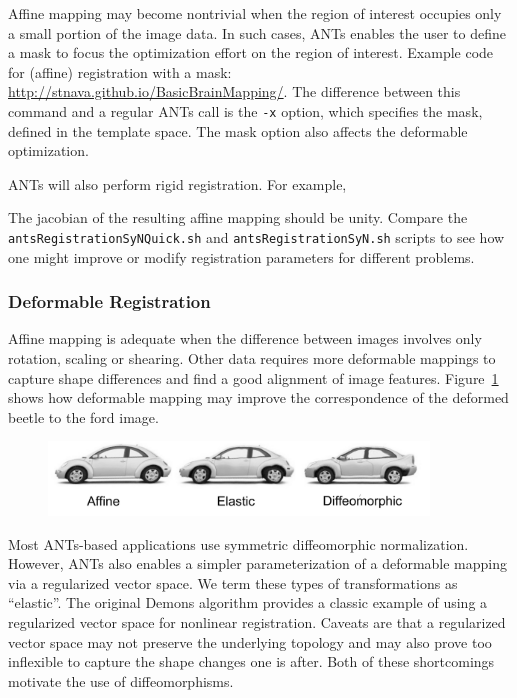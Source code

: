 \documentclass{InsightArticle}
\begin{document}
Affine mapping may become nontrivial when the region of interest 
occupies only a small portion of the image data.  In such cases, 
ANTs enables the user to define a mask to focus the optimization 
effort on the region of interest.  
Example code for (affine) registration with a mask: 
\href{http://stnava.github.io/BasicBrainMapping/}{http://stnava.github.io/BasicBrainMapping/}.
The difference between this command 
and a regular ANTs call is the \verb"-x" option, which specifies the mask, defined in the 
template space.   The mask option also affects the deformable
optimization. 



  ANTs will also perform rigid registration.  For example,  

The jacobian of the resulting affine mapping should be unity.  Compare
the \texttt{antsRegistrationSyNQuick.sh} and
\texttt{antsRegistrationSyN.sh} scripts to see how one might improve
or modify registration parameters for different problems.

\subsubsection{Deformable Registration}
Affine mapping is adequate when the
difference between images involves only rotation, scaling or shearing.
Other data requires more deformable mappings to capture shape
differences and find a good alignment of image features.
Figure~\ref{fig:antshier} shows how deformable mapping may improve the
correspondence of the deformed beetle to the ford image.
\begin{figure}
\includegraphics[width=0.9\textwidth]{./Figures/ANTSElastToDiff.pdf} 
\vspace{-0.1in}
\label{fig:antshier}
\end{figure}
Most ANTs-based applications use symmetric diffeomorphic normalization.  However, 
ANTs also enables a simpler parameterization of a deformable mapping via a regularized 
vector space.  We term these types of transformations as ``elastic''.  The original Demons algorithm 
provides a classic example of using a regularized vector space for nonlinear registration.  
Caveats are that a regularized vector space may not preserve the underlying topology 
and may also prove too inflexible to capture the shape changes one is after.  Both of these 
shortcomings motivate the use of diffeomorphisms. 
\end{document}
